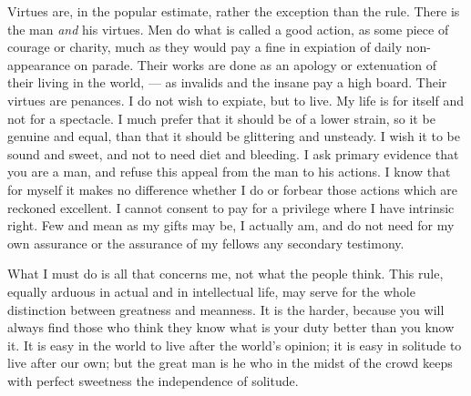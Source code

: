 \documentclass[12pt]{article}
\begin{document}
Virtues are, in the popular estimate, rather the exception than the rule.
There is the man {\it and} his virtues. Men do what is called a good action, as
some piece of courage or charity, much as they would pay a fine in expiation
of daily non-appearance on parade. Their works are done as an apology or
extenuation of their living in the world, --- as invalids and the insane pay
a high board. Their virtues are penances. I do not wish to expiate, but to
live. My life is for itself and not for a spectacle. I much prefer that it
should be of a lower strain, so it be genuine and equal, than that it should
be glittering and unsteady. I wish it to be sound and sweet, and not to need
diet and bleeding. I ask primary evidence that you are a man, and refuse
this appeal from the man to his actions. I know that for myself it makes no
difference whether I do or forbear those actions which are reckoned
excellent. I cannot consent to pay for a privilege where I have intrinsic
right. Few and mean as my gifts may be, I actually am, and do not need for
my own assurance or the assurance of my fellows any secondary testimony.

What I must do is all that concerns me, not what the people think. This
rule, equally arduous in actual and in intellectual life, may serve for the
whole distinction between greatness and meanness. It is the harder, because
you will always find those who think they know what is your duty better than
you know it. It is easy in the world to live after the world's opinion; it
is easy in solitude to live after our own; but the great man is he who in
the midst of the crowd keeps with perfect sweetness the independence of
solitude.
\end{document}
